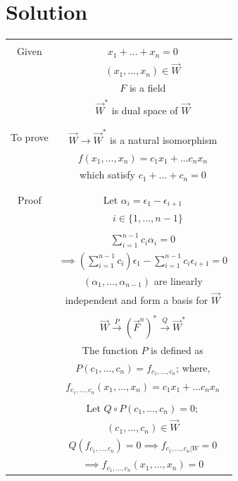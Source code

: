 \documentclass[journal,12pt,twocolumn]{IEEEtran}
\begin{document}
\section{Solution}
\begin{table}[ht]
\begin{center}
\begin{tabular}{|c|c|}
\hline
& \\
Given & $x_1+ \hdots+x_n = 0$ \\
& $(x_1, \hdots , x_n) \in \vec{W}$\\
& $F$ is a field\\
& $\vec{W}^*$ is dual space of $\vec{W}$ \\
& \\
\hline
& \\
To prove & $\vec{W} \xrightarrow{} \vec{W}^*$ is a natural isomorphism\\
& $f(x_1, \hdots , x_n) = c_1x_1 + \hdots c_nx_n$\\
& which satisfy $c_1 + \hdots + c_n = 0$\\
& \\
\hline
& \\
Proof & Let $\alpha_i = \epsilon_1 - \epsilon_{i+1}$ \\ 
& $\quad i \in \{1,\hdots, n-1\}$ \\
& \\
& $\sum_{i=1}^{n-1} c_i \alpha_i = 0$ \\
& $\implies \left(\sum_{i=1}^{n-1} c_i \right) \epsilon_1 - \sum_{i=1}^{n-1} c_i \epsilon_{i+1} = 0$ \\
& $(\alpha_1, \hdots, \alpha_{n-1})$ are linearly\\
& independent and form a basis for $\vec{W}$ \\
& \\
& $\vec{W} \xrightarrow{P} (\vec{F}^n)^* \xrightarrow{Q} \vec{W}^*$ \\
& The function $P$ is defined as \\
& $P(c_1,\hdots,c_n) = f_{c_1,\hdots,c_n}$; where, \\
& $f_{c_1,\hdots,c_n}(x_1, \hdots , x_n) = c_1x_1 + \hdots c_nx_n$ \\
& \\
& Let $Q \circ P (c_1,\hdots,c_n) = 0;$ \\
& $(c_1,\hdots,c_n) \in \vec{W}$ \\
& $Q(f_{c_1,\hdots,c_n}) = 0 \implies f_{c_1,\hdots,c_n|W} = 0$ \\
& $\implies f_{c_1,\hdots,c_n}(x_1, \hdots , x_n) = 0$ \\

\end{tabular}
\end{center}
\end{table}
\end{document}
